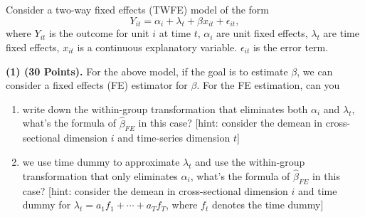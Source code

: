 \begin{tcolorbox}[bxbase,colback=ceng!3,colframe=ceng,boxed title style={colback=ceng},fontupper=\small,
  title={中南大学 2025 年春季博士研究生《高级计量经济学 DP》课程考试试卷（第 1 页）}]
Consider a two-way fixed effects (TWFE) model of the form
\[
Y_{it}=\alpha_i+\lambda_t+\beta x_{it}+\epsilon_{it},
\]
where $Y_{it}$ is the outcome for unit $i$ at time $t$, $\alpha_i$ are unit fixed effects, $\lambda_t$ are time fixed effects, $x_{it}$ is a continuous explanatory variable. $\epsilon_{it}$ is the error term.

\textbf{(1) (30 Points).} For the above model, if the goal is to estimate $\beta$, we can consider a fixed effects (FE) estimator for $\beta$. For the FE estimation, can you
\begin{enumerate}[label=(\alph*)]
  \item write down the within-group transformation that eliminates both $\alpha_i$ and $\lambda_t$, what's the formula of $\hat\beta_{FE}$ in this case? [hint: consider the demean in cross-sectional dimension $i$ and time-series dimension $t$]
  \item we use time dummy to approximate $\lambda_t$ and use the within-group transformation that only eliminates $\alpha_i$, what's the formula of $\hat\beta_{FE}$ in this case? [hint: consider the demean in cross-sectional dimension $i$ and time dummy for $\lambda_t=a_1f_1+\cdots+a_Tf_T$, where $f_t$ denotes the time dummy]
\end{enumerate}


\end{tcolorbox}
